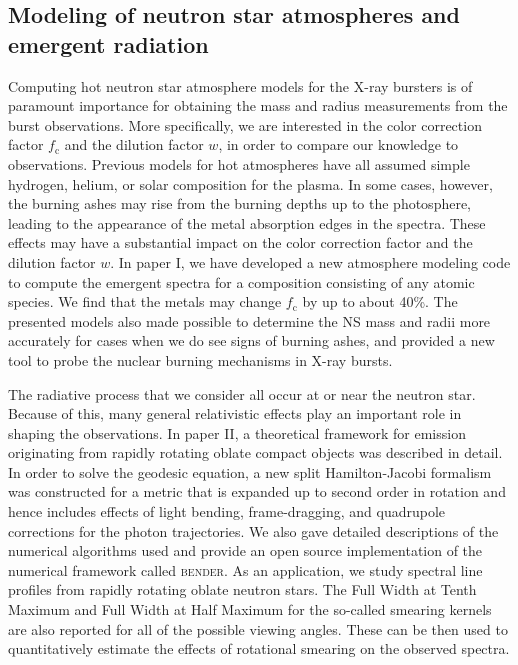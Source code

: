 \subsection{Modeling of neutron star atmospheres and emergent radiation}

Computing hot neutron star atmosphere models for the X-ray bursters is of paramount importance for obtaining the mass and radius measurements from the burst observations.
More specifically, we are interested in the color correction factor $f_{\mathrm{c}}$ and the dilution factor $w$, in order to compare our knowledge to observations.
Previous models for hot atmospheres have all assumed simple hydrogen, helium, or solar composition for the plasma.
In some cases, however, the burning ashes may rise from the burning depths up to the photosphere, leading to the appearance of the metal absorption edges in the spectra.
These effects may have a substantial impact on the color correction factor and the dilution factor $w$.
In paper I, we have developed a new atmosphere modeling code to compute the emergent spectra for a composition consisting of any atomic species.
We find that the metals may change $f_{\mathrm{c}}$ by up to about 40\%.
The presented models also made possible to determine the NS mass and radii more accurately for cases when we do see signs of burning ashes, and provided a new tool to probe the nuclear burning mechanisms in X-ray bursts.

The radiative process that we consider all occur at or near the neutron star.
Because of this, many general relativistic effects play an important role in shaping the observations.
In paper II, a theoretical framework for emission originating from rapidly rotating oblate compact objects was described in detail.
In order to solve the geodesic equation, a new split Hamilton-Jacobi formalism was constructed for a metric that is expanded up to second order in rotation and hence includes effects of light bending, frame-dragging, and quadrupole corrections for the photon trajectories.
We also gave detailed descriptions of the numerical algorithms used and provide an open source implementation of the numerical framework called \textsc{bender}.
As an application, we study spectral line profiles from rapidly rotating oblate neutron stars. 
The Full Width at Tenth Maximum and Full Width at Half Maximum for the so-called smearing kernels are also reported for all of the possible viewing angles.
These can be then used to quantitatively estimate the effects of rotational smearing on the observed spectra.


